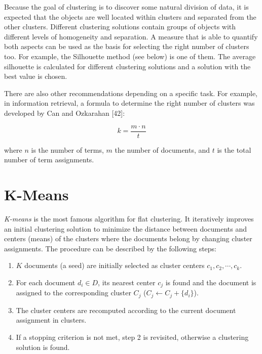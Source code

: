 \documentclass[11pt,openany,executivepaper]{book}
\begin{document}
\indent Because the goal of clustering is to discover some natural division of data, it is expected that the objects are well located within clusters and separated from the other clusters. Different clustering solutions contain groups of objects with different levels of homogeneity and separation. A measure that is able to quantify both aspects can be used as the basis for selecting the right number of clusters too. For example, the Silhouette method (see below) is one of them. The average silhouette is calculated for different clustering solutions and a solution with the best value is chosen.

There are also other recommendations depending on a specific task. For example, in information retrieval, a formula to determine the right number of clusters was developed by Can and Ozkarahan [42]:

\begin{equation}
    k = \frac{m \cdot n}{t}
\end{equation}

\noindent
where \( n \) is the number of terms, \( m \) the number of documents, and \( t \) is the total number of term assignments.

\section{K-Means}

\textit{K-means} is the most famous algorithm for flat clustering.
It iteratively improves an initial clustering solution to minimize the distance between documents and centers (means) of the clusters where the documents belong by changing cluster assignments.
The procedure can be described by the following steps:

\begin{enumerate}
    \item \( K \) documents (a seed) are initially selected as cluster centers \( c_1, c_2, \cdots, c_k \).
    
    \item For each document \( d_i \in D \), its nearest center \( c_j \) is found and the document is assigned to the corresponding cluster \( C_j \) (\( C_j \leftarrow C_j + \{d_i\} \)).
    
    \item The cluster centers are recomputed according to the current document assignment in clusters.
    
    \item If a stopping criterion is not met, step 2 is revisited, otherwise a clustering solution is found.
\end{enumerate}
\end{document}
